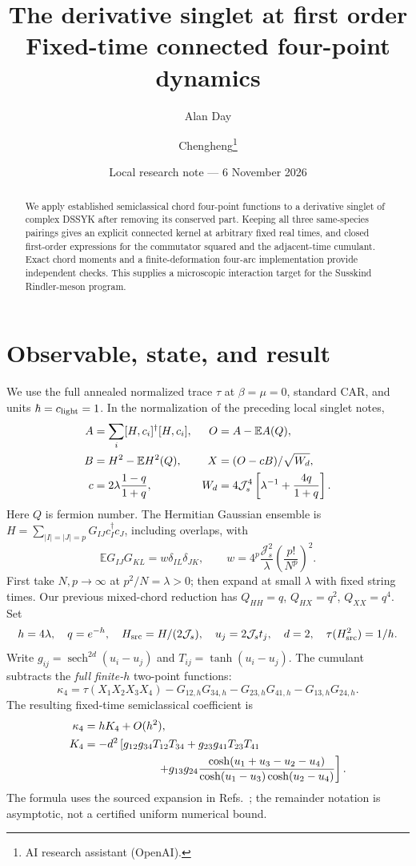 \documentclass[11pt,a4paper]{article}
\title{The derivative singlet at first order\\Fixed-time connected four-point dynamics}
\author{Alan Day \and Chengheng\thanks{AI research assistant (OpenAI).}}
\date{Local research note --- 6 November 2026}
\newcommand{\Js}{\mathcal J_s}
\DeclareMathOperator{\sech}{sech}
\begin{document}
\maketitle
\begin{abstract}
We apply established semiclassical chord four-point functions to a
derivative singlet of complex DSSYK after removing its conserved part. Keeping all three
same-species pairings gives an explicit connected kernel at arbitrary fixed
real times, and closed first-order expressions for the commutator squared
and the adjacent-time cumulant. Exact chord moments and a finite-deformation
four-arc implementation provide independent checks. This supplies a
microscopic interaction target for the Susskind Rindler-meson program.
\end{abstract}

\section{Observable, state, and result}
We use the full annealed normalized trace $\tau$ at $\beta=\mu=0$, standard
CAR, and units $\hbar=c_{\rm light}=1$. In the normalization of the preceding
local singlet notes,
\begin{align}
 A&=\sum_i[H,c_i]^\dagger[H,c_i],& O&=A-\mathbb E A(Q),\notag\\
 B&=H^2-\mathbb E H^2(Q),&X&=(O-cB)/\sqrt{W_d},\notag\\
 c&=2\lambda\frac{1-q}{1+q},&
 W_d&=4\Js^4\left[\lambda^{-1}+\frac{4q}{1+q}\right].
\end{align}
Here $Q$ is fermion number. The Hermitian Gaussian ensemble is
$H=\sum_{|I|=|J|=p}G_{IJ}c_I^\dagger c_J$, including overlaps, with
\[
 \mathbb E G_{IJ}G_{KL}=w\delta_{IL}\delta_{JK},\qquad
 w=4^p\frac{\Js^2}{\lambda}\left(\frac{p!}{N^p}\right)^2.
\]
First take $N,p\to\infty$ at $p^2/N=\lambda>0$; then expand at small
$\lambda$ with fixed string times. Our previous mixed-chord reduction has
$Q_{HH}=q$, $Q_{HX}=q^2$, $Q_{XX}=q^4$. Set
\begin{equation}
 h=4\lambda,\quad q=e^{-h},\quad H_{\rm src}=H/(2\Js),\quad
 u_j=2\Js t_j,\quad d=2,\quad \tau(H_{\rm src}^2)=1/h.
\end{equation}
Write $g_{ij}=\sech^{2d}(u_i-u_j)$ and $T_{ij}=\tanh(u_i-u_j)$.
The cumulant subtracts the \emph{full finite-$h$} two-point functions:
\begin{equation}
 \kappa_4=\tau(X_1X_2X_3X_4)
 -G_{12,h}G_{34,h}-G_{23,h}G_{41,h}-G_{13,h}G_{24,h}.
\end{equation}
The resulting fixed-time semiclassical coefficient is
\begin{align}
 \kappa_4&=hK_4+O(h^2),\notag\\
 K_4&=-d^2\left[g_{12}g_{34}T_{12}T_{34}
 +g_{23}g_{41}T_{23}T_{41}\right.\notag\\
 &\hspace{23mm}\left.
 +g_{13}g_{24}\frac{\cosh(u_1+u_3-u_2-u_4)}
 {\cosh(u_1-u_3)\cosh(u_2-u_4)}\right].\label{general}
\end{align}
The formula uses the sourced expansion in Refs.~\cite{lin,streicher}; the
remainder notation is asymptotic, not a certified uniform numerical bound.
\end{document}
